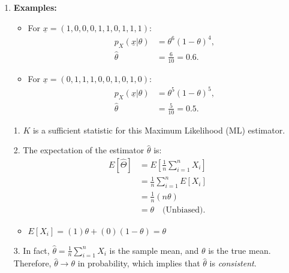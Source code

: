 \begin{example}
\begin{enumerate}
        \item \textbf{Examples:}
        \begin{itemize}
            \item For $\underline{x} = (1, 0, 0, 0, 1, 1, 0, 1, 1, 1)$:
            \begin{align*}
            p_X(\underline{x} | \theta) &= \theta^6 (1 - \theta)^4, \\
            \hat{\theta} &= \frac{6}{10} = 0.6.
            \end{align*}
            \item For $\underline{x} = (0, 1, 1, 1, 0, 0, 1, 0, 1, 0)$:
            \begin{align*}
            p_X(\underline{x} | \theta) &= \theta^5 (1 - \theta)^5, \\
            \hat{\theta} &= \frac{5}{10} = 0.5.
            \end{align*}
        \end{itemize}
    \end{enumerate}
\end{example}

\begin{notes}
    \begin{itemize}
        \item[1.] $K$ is a sufficient statistic for this Maximum Likelihood (ML) estimator.
    
        \item[2.] The expectation of the estimator $\hat{\theta}$ is:
        \begin{align*}
        E[\hat{\Theta}] &= E\left[\frac{1}{n} \sum_{i=1}^n X_i \right] \\
        &= \frac{1}{n} \sum_{i=1}^n E[X_i] \\
        &= \frac{1}{n} (n \theta) \\
        &= \theta \quad \text{(Unbiased)}.
        \end{align*}
        \begin{itemize}
            \item $E[X_i] = (1)\theta + (0)(1 - \theta) = \theta$
        \end{itemize}
        
        \item[3.] In fact, $\hat{\theta} = \frac{1}{n} \sum_{i=1}^n X_i$ is the sample mean, and $\theta$ is the true mean. Therefore, $\hat{\theta} \to \theta$ in probability, which implies that $\hat{\theta}$ is \textit{consistent}.
    \end{itemize}    
\end{notes}



